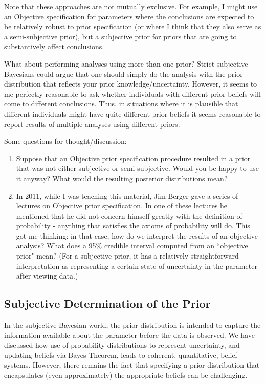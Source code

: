 \documentclass[12pt]{article}
\begin{document}
Note that these approaches are not mutually exclusive. For example, I might use an Objective specification for parameters where the conclusions are expected to be relatively robust to prior specification (or where I think that they also serve as a semi-subjective prior), but a subjective prior for priors that are
going to substantively affect conclusions.

What about performing analyses using more than one prior? Strict subjective Bayesians could argue that one should simply do the analysis with
the prior distribution that reflects your prior knowledge/uncertainty.
However, it seems to me perfectly reasonable to 
ask whether individuals with different prior beliefs will come to different conclusions. Thus, in situations
where it is plausible that different individuals might have quite different prior beliefs it seems reasonable to report results of multiple analyses using different priors.

Some questions for thought/discussion:
\begin{enumerate}
\item Suppose that an Objective prior specification procedure resulted in a prior that was not
either subjective or semi-subjective. Would you be happy to use it anyway? What would the resulting posterior distributions mean?
\item In 2011, while I was teaching this material, Jim Berger gave a series of lectures on Objective prior specification. In one of these lectures he mentioned that he did not concern himself greatly with the definition of probability - anything that satisfies the axioms of probability will do. This got me thinking: in that case, how do we interpret the results of an objective analysis?
What does a 95\% credible interval computed from an ``objective prior" mean? (For a subjective
prior, it has a relatively straightforward interpretation as representing a certain state of uncertainty in the parameter after viewing data.)
\end{enumerate}



\subsection{Subjective Determination of the Prior}

In the subjective Bayesian world, the prior distribution is intended
to capture the information available about the parameter before the
data is observed.  We have discussed how use of probability distributions to represent uncertainty,
and updating beliefs via Bayes Theorem, leads to coherent, quantitative,
belief systems. However, there remains the fact that specifying a 
prior distribution that encapsulates (even approximately) the appropriate beliefs can be challenging.  
\end{document}
